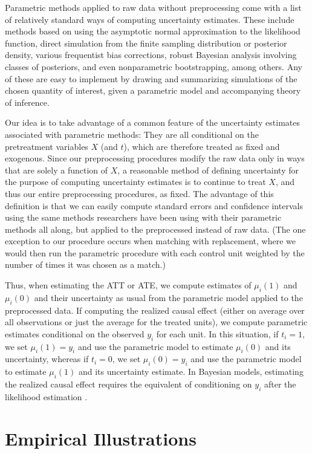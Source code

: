 \documentclass[11pt,titlepage]{article}
\begin{document}
Parametric methods applied to raw data without preprocessing come with
a list of relatively standard ways of computing uncertainty estimates.
These include methods based on using the asymptotic normal
approximation to the likelihood function, direct simulation from the
finite sampling distribution or posterior density, various frequentist
bias corrections, robust Bayesian analysis involving classes of
posteriors, and even nonparametric bootstrapping, among others.  Any
of these are easy to implement by drawing and summarizing simulations
of the chosen quantity of interest, given a parametric model and
accompanying theory of inference.

Our idea is to take advantage of a common feature of the uncertainty
estimates associated with parametric methods: They are all conditional
on the pretreatment variables $X$ (and $t$), which are therefore
treated as fixed and exogenous.  Since our preprocessing procedures
modify the raw data only in ways that are solely a function of $X$, a
reasonable method of defining uncertainty for the purpose of computing
uncertainty estimates is to continue to treat $X$, and thus our entire
preprocessing procedures, as fixed.  The advantage of this definition
is that we can easily compute standard errors and confidence intervals
using the same methods researchers have been using with their
parametric methods all along, but applied to the preprocessed instead
of raw data.  (The one exception to our procedure occurs when matching
with replacement, where we would then run the parametric procedure
with each control unit weighted by the number of times it was chosen
as a match.)

Thus, when estimating the ATT or ATE, we compute estimates of
$\mu_i(1)$ and $\mu_i(0)$ and their uncertainty as usual from the
parametric model applied to the preprocessed data.  If computing the
realized causal effect (either on average over all observations or
just the average for the treated units), we compute parametric
estimates conditional on the observed $y_i$ for each unit.  In this
situation, if $t_i=1$, we set $\mu_i(1)=y_i$ and use the parametric
model to estimate $\mu_i(0)$ and its uncertainty, whereas if $t_i=0$,
we set $\mu_i(0)=y_i$ and use the parametric model to estimate
$\mu_i(1)$ and its uncertainty estimate.  In Bayesian models,
estimating the realized causal effect requires the equivalent of
conditioning on $y_i$ after the likelihood estimation \citep[as
in][]{King97}.

\section{Empirical Illustrations}
\end{document}
